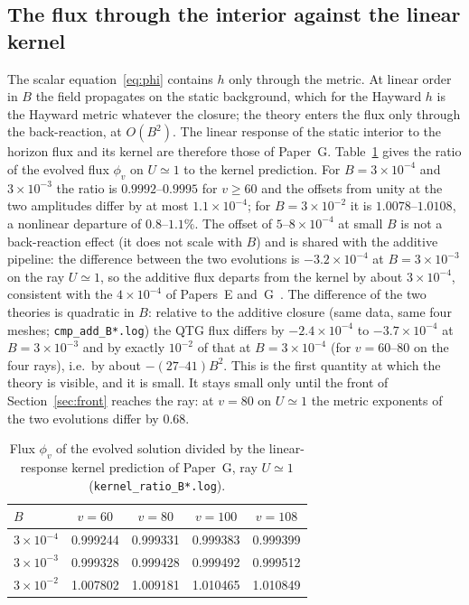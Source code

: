 \documentclass[11pt]{article}
\begin{document}
\subsection{The flux through the interior against the linear kernel}

The scalar equation~\eqref{eq:phi} contains $h$ only through the metric. At linear order in $B$ the field propagates on the static background, which for the Hayward $h$ is the Hayward metric whatever the closure; the theory enters the flux only through the back-reaction, at $O(B^{2})$. The linear response of the static interior to the horizon flux and its kernel are therefore those of Paper~G. Table~\ref{tab:kernel} gives the ratio of the evolved flux $\phi_v$ on $U\simeq1$ to the kernel prediction. For $B=3\times10^{-4}$ and $3\times10^{-3}$ the ratio is $0.9992$--$0.9995$ for $v\ge60$ and the offsets from unity at the two amplitudes differ by at most $1.1\times10^{-4}$; for $B=3\times10^{-2}$ it is $1.0078$--$1.0108$, a nonlinear departure of $0.8$--$1.1\%$. The offset of $5$--$8\times10^{-4}$ at small $B$ is not a back-reaction effect (it does not scale with $B$) and is shared with the additive pipeline: the difference between the two evolutions is $-3.2\times10^{-4}$ at $B=3\times10^{-3}$ on the ray $U\simeq1$, so the additive flux departs from the kernel by about $3\times10^{-4}$, consistent with the $4\times10^{-4}$ of Papers~E and~G~\citep{PaperE,PaperG}. The difference of the two theories is quadratic in $B$: relative to the additive closure (same data, same four meshes; \texttt{cmp\_add\_B*.log}) the QTG flux differs by $-2.4\times10^{-4}$ to $-3.7\times10^{-4}$ at $B=3\times10^{-3}$ and by exactly $10^{-2}$ of that at $B=3\times10^{-4}$ (for $v=60$--$80$ on the four rays), i.e.\ by about $-(27\text{--}41)B^{2}$. This is the first quantity at which the theory is visible, and it is small. It stays small only until the front of Section~\ref{sec:front} reaches the ray: at $v=80$ on $U\simeq1$ the metric exponents of the two evolutions differ by $0.68$.

\begin{table}[ht]\centering\small
\caption{Flux $\phi_v$ of the evolved solution divided by the linear-response kernel prediction of Paper~G, ray $U\simeq1$ (\texttt{kernel\_ratio\_B*.log}).}\label{tab:kernel}
\begin{tabular}{lcccc}
\toprule
$B$ & $v=60$ & $v=80$ & $v=100$ & $v=108$\\\midrule
$3\times10^{-4}$ & 0.999244 & 0.999331 & 0.999383 & 0.999399\\
$3\times10^{-3}$ & 0.999328 & 0.999428 & 0.999492 & 0.999512\\
$3\times10^{-2}$ & 1.007802 & 1.009181 & 1.010465 & 1.010849\\\bottomrule
\end{tabular}
\end{table}
\end{document}
